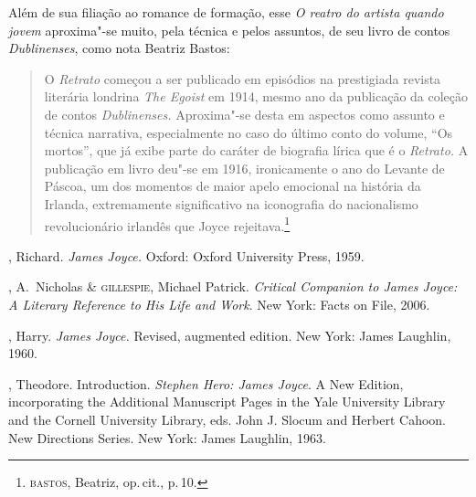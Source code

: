 Além de sua filiação ao romance de formação, esse \textit{O reatro do artista quando jovem}
aproxima"-se muito, pela técnica e pelos assuntos, de seu livro de contos \textit{Dublinenses}, como nota Beatriz Bastos:

\begin{quote}
O \textit{Retrato} começou a ser publicado em episódios na prestigiada revista
literária londrina \textit{The Egoist} em 1914, mesmo ano da publicação da
coleção de contos \textit{Dublinenses.} Aproxima"-se desta em aspectos como
assunto e técnica narrativa, especialmente no caso do último conto do volume,
“Os mortos”, que já exibe parte do caráter de biografia lírica que é o
\textit{Retrato.} A publicação em livro deu"-se em 1916, ironicamente o
ano do Levante de Páscoa, um dos momentos de maior apelo emocional na história
da Irlanda, extremamente significativo na iconografia do nacionalismo
revolucionário irlandês que Joyce rejeitava.\footnote{\textsc{bastos}, Beatriz, op.\,cit., p.\,10.}
\end{quote}

\begin{bibliohedra}

, Richard.  \textit{James Joyce.}  Oxford: Oxford University
Press, 1959.

, A.~Nicholas \& \textsc{gillespie}, Michael Patrick. 
\textit{Critical Companion to James Joyce: A Literary Reference to His Life and Work}.
New York: Facts on File, 2006.

, Harry.  \textit{James Joyce.}  Revised, augmented edition.  New
York: James Laughlin, 1960.

, Theodore.  Introduction.  \textit{Stephen Hero: James Joyce}. 
A New Edition, incorporating the Additional Manuscript Pages in the Yale
University Library and the Cornell University Library, eds. John J.
Slocum and Herbert Cahoon.  New Directions Series.  New York: James
Laughlin, 1963.

\end{bibliohedra}